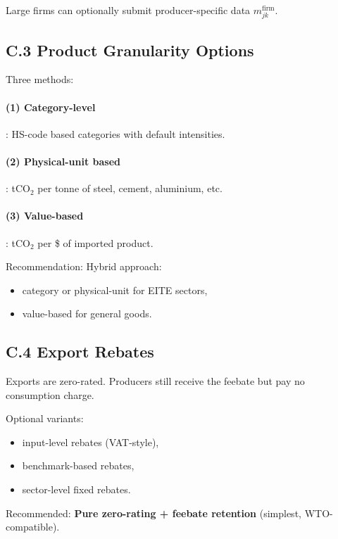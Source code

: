 \documentclass[12pt]{article}
\begin{document}
Large firms can optionally submit producer-specific data $m_{jk}^{\text{firm}}$.

\subsection{C.3 Product Granularity Options}

Three methods:

\paragraph{(1) Category-level}:  
HS-code based categories with default intensities.

\paragraph{(2) Physical-unit based}:  
tCO$_2$ per tonne of steel, cement, aluminium, etc.

\paragraph{(3) Value-based}:  
tCO$_2$ per \$ of imported product.

Recommendation:  
Hybrid approach:
\begin{itemize}
    \item category or physical-unit for EITE sectors,
    \item value-based for general goods.
\end{itemize}

\subsection{C.4 Export Rebates}

Exports are zero-rated.  
Producers still receive the feebate but pay no consumption charge.

Optional variants:
\begin{itemize}
    \item input-level rebates (VAT-style),
    \item benchmark-based rebates,
    \item sector-level fixed rebates.
\end{itemize}

Recommended:  
\textbf{Pure zero-rating + feebate retention} (simplest, WTO-compatible).
\end{document}
